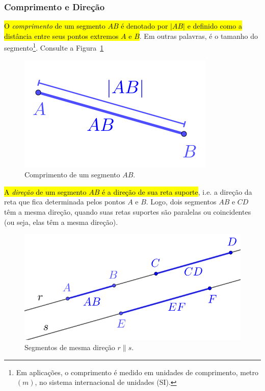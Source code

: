\subsubsection{Comprimento e Direção}

\hl{O \emph{comprimento} de um segmento $AB$ é denotado por $|AB|$ e definido como a distância entre seus pontos extremos $A$ e $B$}. Em outras palavras, é o tamanho do segmento\footnote{Em aplicações, o comprimento é medido em unidades de comprimento, metro $(m)$, no sistema internacional de unidades (SI).}. Consulte a Figura~\ref{cap_vetor_sec_segorien:fig:segmento_norma}

\begin{figure}[h]
  \centering
  \includegraphics{./cap_vetor/dados/fig_segmento_norma/fig.png}
  \caption{Comprimento de um segmento $AB$.}
  \label{cap_vetor_sec_segorien:fig:segmento_norma}
\end{figure}

\hl{A \emph{direção} de um segmento $AB$ é a direção de sua reta suporte}, i.e. a direção da reta que fica determinada pelos pontos $A$ e $B$. Logo, dois segmentos $AB$ e $CD$ têm a mesma direção, quando suas retas suportes são paralelas ou coincidentes (ou seja, elas têm a mesma direção).

\begin{figure}[h]
  \centering
  \includegraphics{./cap_vetor/dados/fig_segmento_direcao/fig.png}
  \caption{Segmentos de mesma direção $r\parallel s$.}
  \label{cap_vetor_sec_segorien:fig:segmento_direção.}
\end{figure}

